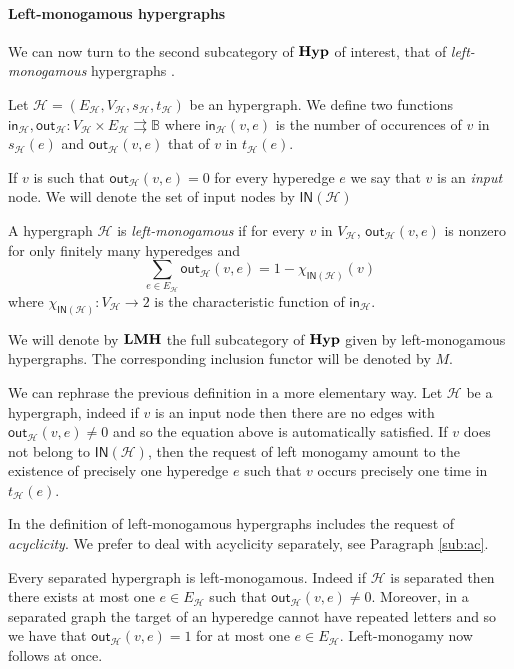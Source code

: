 \documentclass[3p]{elsarticle}
\newcommand{\ind}[1]{\mathsf{in}_{\mathcal{#1}}}
\newcommand{\ino}[1]{\mathsf{IN}({\mathcal{#1}})}
\newcommand{\outd}[1]{\mathsf{out}_{\mathcal{#1}}}
\newcommand{\catname}[1]{\textbf{\textup{#1}}}
\newcommand{\lmo}{\catname{LMH}}
\newcommand{\hyp}{\catname{Hyp}}
\theoremstyle{remark}
\theoremstyle{definition}
\begin{document}
\paragraph{Left-monogamous hypergraphs}

We can now turn to the second subcategory of $\hyp$ of interest, that of \emph{left-monogamous} hypergraphs \cite{milosavljevic2023string,fritz2023free}. 

\begin{defi}
	Let $\mathcal{H}=(E_{\mathcal{H}}, V_{\mathcal{H}}, s_{\mathcal{H}}, t_{\mathcal{H}})$ be an hypergraph. We define two functions $\ind{H}, \outd{H}\colon V_{\mathcal{H}}\times E_{\mathcal{H}}\rightrightarrows \mathbb{B}$ where $\ind{H}(v,e)$ is the number of occurences of $v$ in $s_{\mathcal{H}}(e)$ and $\outd{H}(v,e)$ that of $v$ in $t_{\mathcal{H}}(e)$.
	
 	If $v$ is such that $\outd{H}(v,e)=0$ for every hyperedge $e$ we say that $v$ is an \emph{input} node. We will denote the set of input nodes by $\ino{H}$
 	
 		 	A hypergraph $\mathcal{H}$ is \emph{left-monogamous} if for every $v$ in $V_\mathcal{H}$, $\outd{H}(v,e)$ is nonzero for only finitely many hyperedges and
 		 	\[\sum_{e\in E_{\mathcal{H}}} \outd{H}(v, e) = 1 - \chi_{\ino{H}}(v)\]
 		 	where $\chi_{\ino{H}}\colon V_{\mathcal{H}}\to 2$ is the characteristic function of $\ind{H}$.
 		 	
 	We will denote by $\lmo$ the full subcategory of $\hyp$ given by left-monogamous hypergraphs. The corresponding inclusion functor will be denoted by $M$.
\end{defi}


\begin{rem}We can rephrase the previous definition in a more elementary way. Let $\mathcal{H}$ be a hypergraph, indeed if $v$ is an input node then there are no edges with $\outd{H}(v, e)\neq 0$ and so the equation above is automatically satisfied. If $v$ does not belong to $\ino{H}$, then the request of left monogamy amount to the existence of precisely one hyperedge $e$ such that $v$ occurs precisely one time in $t_{\mathcal{H}}(e)$.
\end{rem} 
\begin{rem}In \cite{fritz2023free} the definition of left-monogamous hypergraphs includes the request of \emph{acyclicity}.  We prefer to deal with acyclicity separately, see Paragraph \ref{sub:ac}.
\end{rem}

\begin{rem}
	Every separated hypergraph is left-monogamous. Indeed if $\mathcal{H}$ is separated then there exists at most one $e\in E_{\mathcal{H}}$ such that $\outd{H}(v, e) \neq 0$. Moreover, in a separated graph the target of an hyperedge cannot have repeated letters and so we have that  $\outd{H}(v, e) = 1$ for at most one $e\in E_{\mathcal{H}}$. Left-monogamy now follows at once.
\end{rem}
\end{document}
